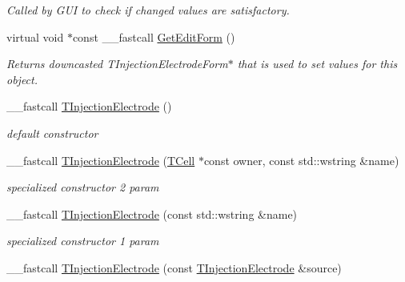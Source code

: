 \begin{DoxyCompactItemize}
\begin{DoxyCompactList}\small\item\em Called by G\+U\+I to check if changed values are satisfactory. \end{DoxyCompactList}\item 
\hypertarget{class_t_injection_electrode_a825ef8d17c3e3612aeb6b53c9e3aa539}{virtual void $\ast$const \+\_\+\+\_\+fastcall \hyperlink{class_t_injection_electrode_a825ef8d17c3e3612aeb6b53c9e3aa539}{Get\+Edit\+Form} ()}\label{class_t_injection_electrode_a825ef8d17c3e3612aeb6b53c9e3aa539}

\begin{DoxyCompactList}\small\item\em Returns downcasted T\+Injection\+Electrode\+Form$\ast$ that is used to set values for this object. \end{DoxyCompactList}\item 
\hypertarget{class_t_injection_electrode_a804cd0834dd64ce2cc0ff9ef828a2d81}{\+\_\+\+\_\+fastcall \hyperlink{class_t_injection_electrode_a804cd0834dd64ce2cc0ff9ef828a2d81}{T\+Injection\+Electrode} ()}\label{class_t_injection_electrode_a804cd0834dd64ce2cc0ff9ef828a2d81}

\begin{DoxyCompactList}\small\item\em default constructor \end{DoxyCompactList}\item 
\hypertarget{class_t_injection_electrode_aac37df3fe47e264e2f5314025de25499}{\+\_\+\+\_\+fastcall \hyperlink{class_t_injection_electrode_aac37df3fe47e264e2f5314025de25499}{T\+Injection\+Electrode} (\hyperlink{class_t_cell}{T\+Cell} $\ast$const owner, const std\+::wstring \&name)}\label{class_t_injection_electrode_aac37df3fe47e264e2f5314025de25499}

\begin{DoxyCompactList}\small\item\em specialized constructor 2 param \end{DoxyCompactList}\item 
\hypertarget{class_t_injection_electrode_aa897a09ecd4e2697eb782c311de032d2}{\+\_\+\+\_\+fastcall \hyperlink{class_t_injection_electrode_aa897a09ecd4e2697eb782c311de032d2}{T\+Injection\+Electrode} (const std\+::wstring \&name)}\label{class_t_injection_electrode_aa897a09ecd4e2697eb782c311de032d2}

\begin{DoxyCompactList}\small\item\em specialized constructor 1 param \end{DoxyCompactList}\item 
\hypertarget{class_t_injection_electrode_ac8f9c7ae8dfa4894906dbed1cb1040ed}{\+\_\+\+\_\+fastcall \hyperlink{class_t_injection_electrode_ac8f9c7ae8dfa4894906dbed1cb1040ed}{T\+Injection\+Electrode} (const \hyperlink{class_t_injection_electrode}{T\+Injection\+Electrode} \&source)}\label{class_t_injection_electrode_ac8f9c7ae8dfa4894906dbed1cb1040ed}


\end{DoxyCompactItemize}
